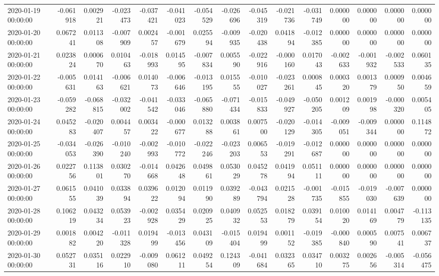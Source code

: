 \begin{tabular}{lrrrrrrrrrrrrrr}
2020-01-19 00:00:00 & -0.061918 & 0.002921 & -0.023473 & -0.037421 & -0.041023 & -0.054529 & -0.026696 & -0.045319 & -0.021736 & -0.031749 & 0.000000 & 0.000000 & 0.000000 & 0.000000 \\
2020-01-20 00:00:00 & 0.067241 & 0.011308 & -0.007909 & 0.002457 & -0.001679 & 0.025594 & -0.009935 & -0.020438 & 0.041894 & -0.012385 & 0.000000 & 0.000000 & 0.000000 & 0.000000 \\
2020-01-21 00:00:00 & 0.023824 & 0.000670 & 0.010463 & -0.018993 & 0.014595 & -0.007834 & 0.005590 & -0.022916 & -0.000160 & 0.017043 & -0.002633 & -0.001932 & -0.002533 & 0.060135 \\
2020-01-22 00:00:00 & -0.005631 & 0.014163 & -0.006621 & 0.014073 & -0.006646 & -0.013195 & 0.015555 & -0.010027 & -0.023261 & 0.000845 & 0.000320 & 0.001379 & 0.000950 & 0.004659 \\
2020-01-23 00:00:00 & -0.059282 & -0.068815 & -0.032002 & -0.041542 & -0.033046 & -0.065880 & -0.071434 & -0.015833 & -0.049927 & -0.050205 & 0.001209 & 0.001998 & -0.000320 & 0.005405 \\
2020-01-24 00:00:00 & 0.045283 & -0.020407 & 0.004457 & 0.003422 & -0.000677 & 0.013288 & 0.003861 & 0.007500 & -0.020129 & -0.014305 & -0.009051 & -0.009344 & 0.000000 & 0.114872 \\
2020-01-25 00:00:00 & -0.034053 & -0.026390 & -0.010240 & -0.002993 & -0.010772 & -0.022246 & -0.023203 & 0.006553 & -0.019291 & -0.012687 & 0.000000 & 0.000000 & 0.000000 & 0.000000 \\
2020-01-26 00:00:00 & 0.022756 & 0.113801 & 0.030270 & -0.014668 & 0.042648 & 0.049861 & 0.053029 & 0.045278 & 0.041994 & 0.051111 & 0.000000 & 0.000000 & 0.000000 & 0.000000 \\
2020-01-27 00:00:00 & 0.061555 & 0.041039 & 0.033894 & 0.039622 & 0.012094 & 0.011990 & 0.039289 & -0.043794 & 0.021528 & -0.001735 & -0.015855 & -0.019030 & -0.007639 & 0.000000 \\
2020-01-28 00:00:00 & 0.106219 & 0.043234 & 0.053923 & -0.002928 & 0.035429 & 0.020925 & 0.040932 & 0.052553 & 0.018279 & 0.039154 & 0.010020 & 0.014169 & 0.004779 & -0.113135 \\
2020-01-29 00:00:00 & 0.001882 & 0.004220 & -0.011328 & 0.019499 & -0.013456 & 0.043109 & -0.015404 & 0.019499 & 0.001152 & -0.019385 & -0.000840 & 0.000590 & 0.007541 & 0.006737 \\
2020-01-30 00:00:00 & 0.052731 & 0.035116 & 0.022910 & -0.009080 & 0.061211 & 0.049254 & 0.124309 & -0.041684 & 0.032365 & 0.034710 & 0.003275 & 0.002656 & -0.005314 & -0.056475 \\

\end{tabular}
